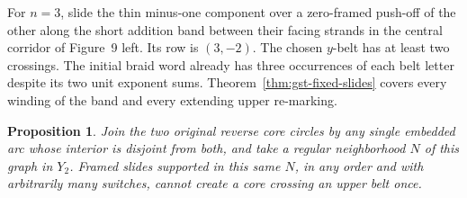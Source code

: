 \documentclass[11pt,letterpaper]{article}
\numberwithin{equation}{section}
\newtheorem{proposition}[theorem]{Proposition}
\theoremstyle{remark}
\begin{document}
For \(n=3\), slide the thin minus-one component over a zero-framed
push-off of the other along the short addition band between their
facing strands in the central corridor of Figure~9 left. Its row is \((3,-2)\).
The chosen \(y\)-belt has at least two crossings. The initial braid
word already has three occurrences of each belt letter despite its
two unit exponent sums. Theorem~\ref{thm:gst-fixed-slides} covers
every winding of the band and every extending upper re-marking.

\begin{proposition}\label{prop:gst-carrier}
Join the two original reverse core circles by any single embedded arc
whose interior is disjoint from both, and take a regular neighborhood
\(N\) of this graph in \(Y_2\). Framed slides supported in this same
\(N\), in any order and with arbitrarily many switches, cannot create
a core crossing an upper belt once.
\end{proposition}
\end{document}
